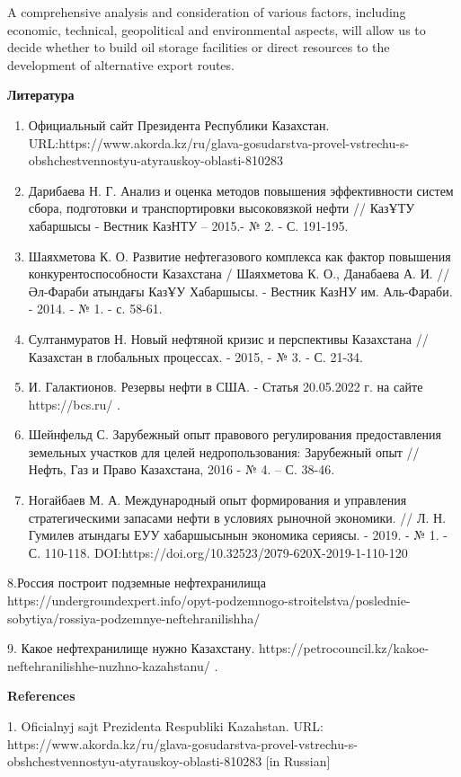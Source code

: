 A comprehensive analysis and consideration of various factors, including
economic, technical, geopolitical and environmental aspects, will allow
us to decide whether to build oil storage facilities or direct resources
to the development of alternative export routes.

{\bfseries Литература}

\begin{enumerate}
\def\labelenumi{\arabic{enumi}.}
\item
  Официальный сайт Президента Республики Казахстан.
  URL:https://www.akorda.kz/ru/glava-gosudarstva-provel-vstrechu-s-obshchestvennostyu-atyrauskoy-oblasti-810283
\item
  Дарибаева Н. Г. Анализ и оценка методов повышения эффективности систем
  сбора, подготовки и транспортировки высоковязкой нефти // КазҰТУ
  хабаршысы - Вестник КазНТУ -- 2015.- № 2. - С. 191-195.
\item
  Шаяхметова К. О. Развитие нефтегазового комплекса как фактор повышения
  конкурентоспособности Казахстана / Шаяхметова К. О., Данабаева А. И.
  // Әл-Фараби атындағы КазҰУ Хабаршысы. - Вестник КазНУ им. Аль-Фараби.
  - 2014. - № 1. - с. 58-61.
\item
  Султанмуратов Н. Новый нефтяной кризис и перспективы Казахстана //
  Казахстан в глобальных процессах. - 2015, - № 3. - С. 21-34.
\item
  И. Галактионов. Резервы нефти в США. - Статья 20.05.2022 г. на сайте
  https://bcs.ru/ .
\item
  Шейнфельд С. Зарубежный опыт правового регулирования предоставления
  земельных участков для целей недропользования: Зарубежный опыт //
  Нефть, Газ и Право Казахстана, 2016 - № 4. -- С. 38-46.
\item
  Ногайбаев М. А. Международный опыт формирования и управления
  стратегическими запасами нефти в условиях рыночной экономики. // Л. Н.
  Гумилев атындагы ЕУУ хабаршысынын экономика сериясы. - 2019. - № 1. -
  С. 110-118. DOI:https://doi.org/10.32523/2079-620X-2019-1-110-120
\end{enumerate}

8.Россия построит подземные нефтехранилища
https://undergroundexpert.info/opyt-podzemnogo-stroitelstva/poslednie-sobytiya/rossiya-podzemnye-neftehranilishha/

9. Какое нефтехранилище нужно Казахстану.
https://petrocouncil.kz/kakoe-neftehranilishhe-nuzhno-kazahstanu/ .

{\bfseries References}

1. Oficial\textquotesingle nyj sajt Prezidenta Respubliki Kazahstan.
URL:
https://www.akorda.kz/ru/glava-gosudarstva-provel-vstrechu-s-obshchestvennostyu-atyrauskoy-oblasti-810283
{[}in Russian{]}

